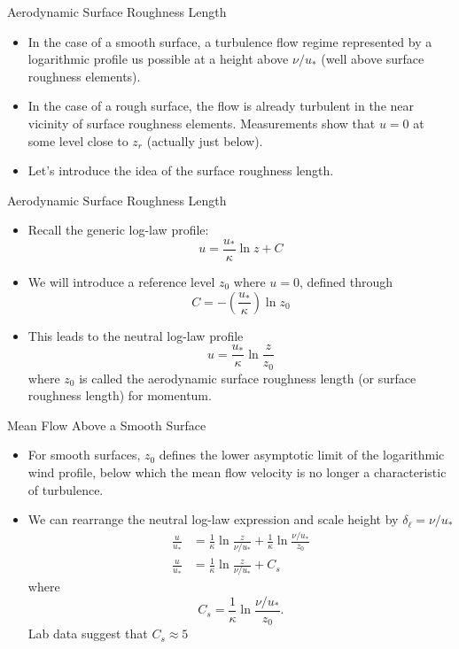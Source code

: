 \begin{frame}{Aerodynamic Surface Roughness Length}

\begin{itemize}
	\item In the case of a smooth surface, a turbulence flow regime represented by a logarithmic profile us possible at a height above $\nu/u_*$ (well above surface roughness elements).
	\item In the case of a rough surface, the flow is already turbulent in the near vicinity of surface roughness elements. Measurements show that $u=0$ at some level close to $z_r$ (actually just below).
	\item Let's introduce the idea of the surface roughness length.
\end{itemize}
\end{frame}
\begin{frame}{Aerodynamic Surface Roughness Length}

\begin{itemize}
	\item Recall the generic log-law profile:
	$$u = \frac{u_*}{\kappa}\ln{z} + C$$
	\item We will introduce a reference level $z_0$ where $u=0$, defined through
	$$C = -\left(\frac{u_*}{\kappa}\right)\ln{z_0}$$
	\item This leads to the neutral log-law profile
	$$\boxed{u = \frac{u_*}{\kappa}\ln{\frac{z}{z_0}}}$$
	where $z_0$ is called the aerodynamic surface roughness length (or surface roughness length) for momentum.
\end{itemize}
\end{frame}
\begin{frame}{Mean Flow Above a Smooth Surface}

\begin{itemize}
	\item For smooth surfaces, $z_0$ defines the lower asymptotic limit of the logarithmic wind profile, below which the mean flow velocity is no longer a characteristic of turbulence.
	\item We can rearrange the neutral log-law expression and scale height by $\delta_\ell = \nu/u_*$
	\begin{align*}
		\frac{u}{u_*} &= \frac{1}{\kappa} \ln{\frac{z}{\nu / u_*}} + \frac{1}{\kappa} \ln{\frac{\nu / u_*}{z_0}}\\
		\frac{u}{u_*} &= \frac{1}{\kappa}  \ln{\frac{z}{\nu / u_*}} + C_s
	\end{align*}
	where $$C_s = \frac{1}{\kappa} \ln{\frac{\nu / u_*}{z_0}}.$$
	Lab data suggest that $C_s \approx 5$
\end{itemize}
\end{frame}
